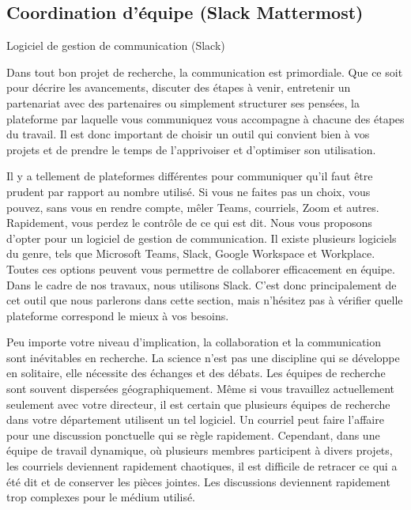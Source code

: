 \documentclass[
  letterpaper,
]{scrbook}
\begin{document}
\hypertarget{coordination-duxe9quipe-slack-mattermost}{%
\subsection{Coordination d'équipe (Slack
Mattermost)}\label{coordination-duxe9quipe-slack-mattermost}}

Logiciel de gestion de communication (Slack)

Dans tout bon projet de recherche, la communication est primordiale. Que
ce soit pour décrire les avancements, discuter des étapes à venir,
entretenir un partenariat avec des partenaires ou simplement structurer
ses pensées, la plateforme par laquelle vous communiquez vous accompagne
à chacune des étapes du travail. Il est donc important de choisir un
outil qui convient bien à vos projets et de prendre le temps de
l'apprivoiser et d'optimiser son utilisation.

Il y a tellement de plateformes différentes pour communiquer qu'il faut
être prudent par rapport au nombre utilisé. Si vous ne faites pas un
choix, vous pouvez, sans vous en rendre compte, mêler Teams, courriels,
Zoom et autres. Rapidement, vous perdez le contrôle de ce qui est dit.
Nous vous proposons d'opter pour un logiciel de gestion de
communication. Il existe plusieurs logiciels du genre, tels que
Microsoft Teams, Slack, Google Workspace et Workplace. Toutes ces
options peuvent vous permettre de collaborer efficacement en équipe.
Dans le cadre de nos travaux, nous utilisons Slack. C'est donc
principalement de cet outil que nous parlerons dans cette section, mais
n'hésitez pas à vérifier quelle plateforme correspond le mieux à vos
besoins.

Peu importe votre niveau d'implication, la collaboration et la
communication sont inévitables en recherche. La science n'est pas une
discipline qui se développe en solitaire, elle nécessite des échanges et
des débats. Les équipes de recherche sont souvent dispersées
géographiquement. Même si vous travaillez actuellement seulement avec
votre directeur, il est certain que plusieurs équipes de recherche dans
votre département utilisent un tel logiciel. Un courriel peut faire
l'affaire pour une discussion ponctuelle qui se règle rapidement.
Cependant, dans une équipe de travail dynamique, où plusieurs membres
participent à divers projets, les courriels deviennent rapidement
chaotiques, il est difficile de retracer ce qui a été dit et de
conserver les pièces jointes. Les discussions deviennent rapidement trop
complexes pour le médium utilisé.
\end{document}
